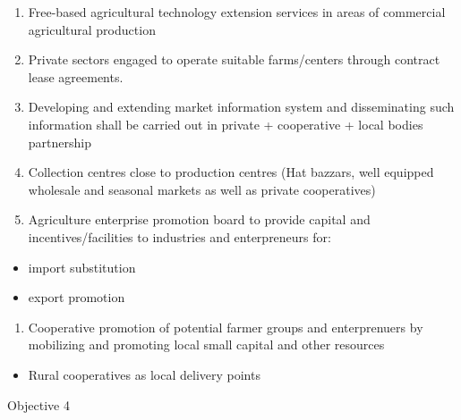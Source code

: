 \documentclass[
  openany]{book}
\providecommand{\tightlist}{%
  \setlength{\itemsep}{0pt}\setlength{\parskip}{0pt}}
\begin{document}
\begin{itemize}
  \begin{enumerate}
  \def\labelenumi{\arabic{enumi}.}
  \setcounter{enumi}{17}
  \tightlist
  \item
    Free-based agricultural technology extension services in areas of commercial agricultural production
  \item
    Private sectors engaged to operate suitable farms/centers through contract lease agreements.
  \item
    Developing and extending market information system and disseminating such information shall be carried out in private + cooperative + local bodies partnership
  \item
    Collection centres close to production centres (Hat bazzars, well equipped wholesale and seasonal markets as well as private cooperatives)
  \item
    Agriculture enterprise promotion board to provide capital and incentives/facilities to industries and enterpreneurs for:
  \end{enumerate}

  \begin{itemize}
  \tightlist
  \item
    import substitution
  \item
    export promotion
  \end{itemize}

  \begin{enumerate}
  \def\labelenumi{\arabic{enumi}.}
  \setcounter{enumi}{22}
  \tightlist
  \item
    Cooperative promotion of potential farmer groups and enterprenuers by mobilizing and promoting local small capital and other resources
  \end{enumerate}

  \begin{itemize}
  \tightlist
  \item
    Rural cooperatives as local delivery points
  \end{itemize}
\end{itemize}

Objective 4
\end{document}
